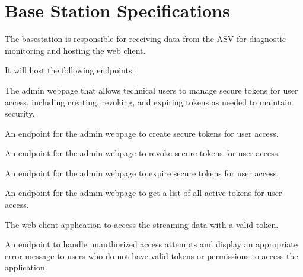 %
%
%
%

\section{Base Station Specifications}
\label{sec:basestation-specifications}
The basestation is responsible for receiving data from the ASV for diagnostic monitoring and hosting the web client.

It will host the following endpoints:

\begin{description}
    \label{itm:endpoints}
    \item[\textit{/admin}] The admin webpage that allows technical users to manage secure tokens for user access, including creating, revoking, and expiring tokens as needed to maintain security.
    \item[\textit{/admin/create\_token}] An endpoint for the admin webpage to create secure tokens for user access.
    \item[\textit{/admin/revoke\_token}] An endpoint for the admin webpage to revoke secure tokens for user access.
    \item[\textit{/admin/expire\_token}] An endpoint for the admin webpage to expire secure tokens for user access.
    \item[\textit{/admin/tokens}] An endpoint for the admin webpage to get a list of all active tokens for user access.

    \item[\textit{/client}] The web client application to access the streaming data with a valid token.
    \item[\textit{/uh\_oh}] An endpoint to handle unauthorized access attempts and display an appropriate error message to users who do not have valid tokens or permissions to access the application.
\end{description}

